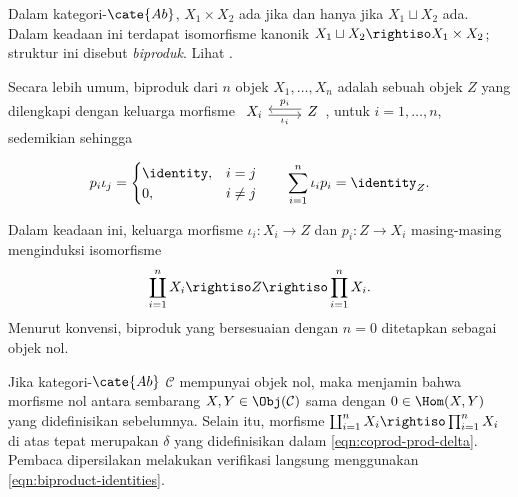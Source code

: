 Dalam kategori-$\cate{Ab}$, $X_1 \times X_2$ ada jika dan hanya jika
$X_1 \sqcup X_2$ ada. Dalam keadaan ini terdapat isomorfisme kanonik
$X_1 \sqcup X_2 \rightiso X_1 \times X_2$; struktur ini disebut
\emph{biproduk}. Lihat \cite[Definisi 3.4.8, Teorema 3.4.9]{Li1}.

Secara lebih umum, biproduk dari $n$ objek $X_1, \ldots, X_n$ adalah sebuah
objek $Z$ yang dilengkapi dengan keluarga morfisme
$\begin{tikzcd} X_i \arrow[r, yshift=-0.5ex, "\iota_i"'] & Z \arrow[l, yshift=0.5ex, "p_i"'] \end{tikzcd}$,
untuk $i = 1, \ldots, n$, sedemikian sehingga

\begin{equation}\label{eqn:biproduct-identities}\begin{gathered}
	p_i \iota_j = \begin{cases} \identity, & i=j \\ 0, & i \neq j \end{cases} \qquad
	\sum_{i=1}^n \iota_i p_i = \identity_{Z}.
\end{gathered}\end{equation}

Dalam keadaan ini, keluarga morfisme $\iota_i: X_i \to Z$ dan
$p_i: Z \to X_i$ masing-masing menginduksi isomorfisme
\[ \coprod_{i=1}^n X_i \rightiso Z \rightiso \prod_{i=1}^n X_i. \]
Menurut konvensi, biproduk yang bersesuaian dengan $n=0$ ditetapkan sebagai
objek nol.

Jika kategori-$\cate{Ab}$ $\mathcal{C}$ mempunyai objek nol, maka
\cite[Lema 3.4.11]{Li1} menjamin bahwa morfisme nol antara sembarang
$X,Y \in \Obj(\mathcal{C})$ sama dengan $0 \in \Hom(X,Y)$ yang didefinisikan
sebelumnya. Selain itu, morfisme
$\coprod_{i=1}^n X_i \rightiso \prod_{i=1}^n X_i$ di atas tepat merupakan
$\delta$ yang didefinisikan dalam \eqref{eqn:coprod-prod-delta}. Pembaca
dipersilakan melakukan verifikasi langsung menggunakan
\eqref{eqn:biproduct-identities}.

